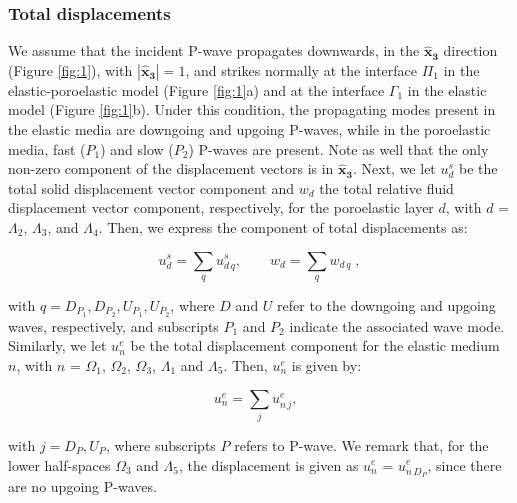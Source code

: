 \documentclass[draft]{agujournal2019}
\begin{document}
\subsubsection{Total displacements}
We assume that the incident P-wave propagates downwards, in the $\bm{\hat x_3}$ direction (Figure \ref{fig:1}), with $|\bm{\hat x_3}| =1$, and strikes normally at the interface $\Pi_1$  in the  elastic-poro\-elastic model (Figure \ref{fig:1}a) and at the interface  $\Gamma_1$ in the elastic model (Figure \ref{fig:1}b). Under this condition, the propagating modes present in the elastic media are downgoing and upgoing P-waves, while in the poroelastic media, fast ($P_1$) and slow ($P_2$) P-waves are present.
Note as well that the only non-zero component of the displacement vectors is in $\bm{\hat x_3}$.
Next, we let
$u{_d^s}$ be the total solid displacement vector component and $w_d$ the total relative fluid displacement vector component, respectively, for the poro\-elastic layer $d$, with $d$ = $\Lambda_2$, $\Lambda_3$, and $\Lambda_4$. Then, we express the component of total displacements as:
\begin{linenomath*}
\begin{equation}\label{Eq.8}
u_d^s =  \sum_q u_{d \,q}^s ,   \qquad
w_d = \sum_q  w_{d \,q}  \;,
\end{equation}
\end{linenomath*}
with $q=D_{P_1},D_{P_2}, U_{P_1},U_{P_2}$, where $D$ and $U$ refer to the downgoing and upgoing waves, respectively, and subscripts $P_1$ and $P_2$ indicate the associated wave mode.
Similarly,  we let $u_n^e$ be the total displacement component for the elastic medium $n$, with $n$ = $\Omega_1$, $\Omega_2$, $\Omega_3$, $\Lambda_1$  and $\Lambda_5$. 
Then,  $u_n^e$ is given by:
\begin{linenomath*}
\begin{equation}\label{Eq.9}
u_n^e = \sum _j u_{n\,j}^e , \; \; 
\end{equation}
\end{linenomath*}
with $j=D_P,U_P$, where subscripts $P$ refers to P-wave. We remark that, for the lower half-spaces $\Omega_3$ and $\Lambda_5$, the displacement is given as ${u_n^e}$ = $u_{n\,D_P}^e $, since there are no upgoing P-waves.
\end{document}
